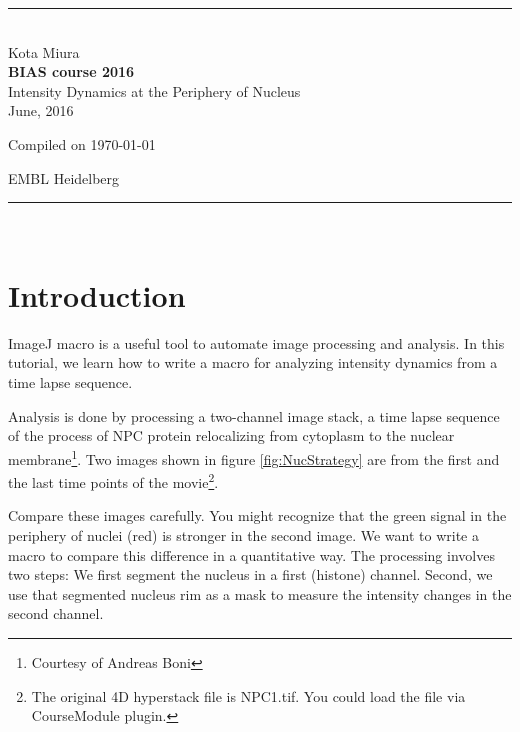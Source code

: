 \documentclass[11pt,a4paper,oneside]{report}
\newcommand{\HRule}{\rule{\linewidth}{0.5mm}}
\newcommand*{\titleTH}{\begingroup
\raggedleft
\HRule\\
\vspace*{\baselineskip}
{\Large Kota Miura}\\[0.167\textheight]

{\bfseries BIAS course 2016}\\[\baselineskip]
{\textcolor{Medium}{\Huge Intensity Dynamics at the Periphery of Nucleus }}\\[\baselineskip]
{\small June, 2016}\par
\vfill

{\small Compiled on \today}\par
{\Large EMBL Heidelberg}\par
\vspace*{3\baselineskip}
\HRule\\
\endgroup}
\begin{document}
\date{\today}

\pagestyle{empty}
\titleTH
\clearpage
\pagestyle{fancyplain}

\begingroup
\hypersetup{linkcolor=black}
\tableofcontents
\endgroup

\clearpage

\setcounter{chapter}{9}


\clearpage{}\section{Introduction}

ImageJ macro is a useful tool to automate image processing and analysis. In this tutorial, we learn how to write a macro for analyzing intensity dynamics from a time lapse sequence. 

Analysis is done by processing a two-channel image stack, a time lapse sequence of the process of NPC protein relocalizing from cytoplasm to the nuclear membrane\footnote{Courtesy of Andreas Boni}. Two images shown in figure \ref{fig:NucStrategy}  are from the first and the last time points of the movie\footnote{The original 4D hyperstack file is NPC1.tif. You could load the file via CourseModule plugin.}.

Compare these images carefully. You might recognize that the green signal in the periphery of nuclei (red) is stronger in the second image. We want to write a macro to compare this difference in a quantitative way. The processing involves two steps: We first segment the nucleus in a first (histone) channel. Second, we use that segmented nucleus rim as a mask to measure the intensity changes in the second channel. 
\end{document}
